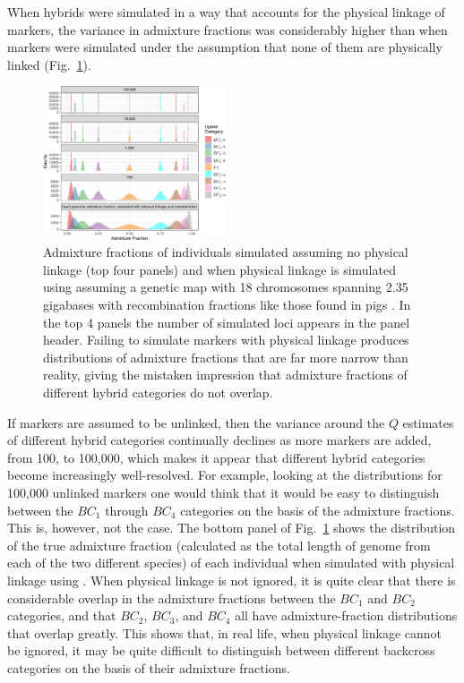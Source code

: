 {When hybrids were simulated in a way that accounts for the physical linkage of
markers, the variance in admixture fractions was considerably higher than when
markers were simulated under the assumption that none of them are physically
linked (Fig.~\ref{fig:ad-fract-sims}).
\begin{figure}
\newcommand{\adfcap}{\footnotesize Admixture fractions of individuals simulated
assuming no physical linkage (top four panels)
and when physical linkage is simulated using \gscramble{} assuming a genetic map with 18 chromosomes spanning 2.35 gigabases with recombination fractions like those found in pigs
\citep{tortereau2012high}.  In the top 4 panels the number
of simulated loci appears in the panel header.  Failing to simulate markers with physical linkage
produces distributions of admixture fractions that are far more narrow than reality, giving the
mistaken impression that admixture fractions of different hybrid categories do not overlap.  }
\includegraphics[width=0.48\textwidth]{figures/link-and-nolink-sims-crop.pdf}
\caption[\adfcap]{\adfcap}
\label{fig:ad-fract-sims}
\end{figure}
If markers are assumed to be unlinked, then the variance around the $Q$ estimates of different 
hybrid categories continually declines as more markers are added, from 100, to 100,000, which 
makes it appear that different hybrid categories become increasingly well-resolved.  For example, 
looking at the distributions for 100,000 unlinked markers one would think that it would be easy to 
distinguish between the $BC_1$ through $BC_4$ categories on the basis of the admixture fractions.
This is, however, not the case.  The bottom panel of Fig.~\ref{fig:ad-fract-sims} shows the distribution
of the true admixture fraction (calculated as the total length of genome from each of the two
different species) of each individual when simulated with physical linkage using \gscramble{}.
When physical linkage is not ignored, it is quite clear that there is considerable overlap in the
admixture fractions between the $BC_1$ and $BC_2$ categories, and that $BC_2$, $BC_3$, and 
$BC_4$ all have admixture-fraction distributions that overlap greatly.  This shows that,
in real life, when physical linkage cannot be ignored, it may be quite difficult to distinguish
between different backcross categories on the basis of their admixture fractions.



}
